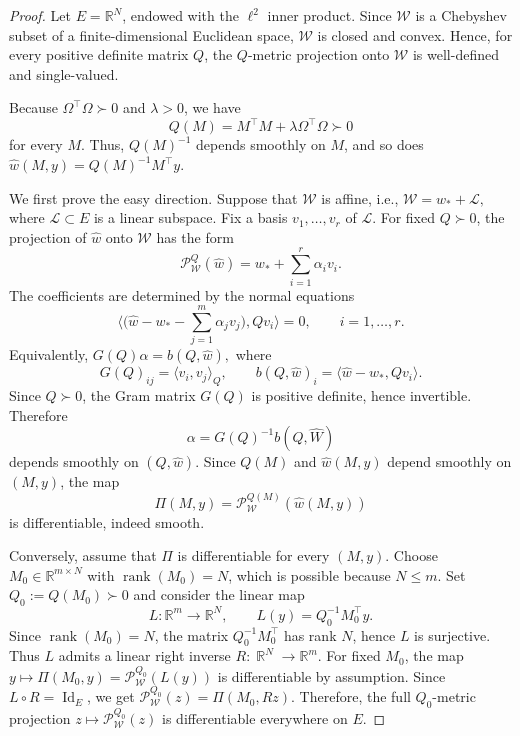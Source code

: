 \documentclass[10pt,a4paper]{amsart}
\DeclareMathOperator{\R}{\mathbb{R}}
\begin{document}
\begin{proof}
Let \(E=\mathbb R^{N}\), endowed with the $\ell^2$ inner product.
Since \(\mathscr W\) is a Chebyshev subset of a finite-dimensional Euclidean
space, \(\mathscr W\) is closed and convex. Hence, for every positive definite
matrix \(Q\), the \(Q\)-metric projection onto \(\mathscr W\) is well-defined
and single-valued.

Because \(\Omega ^\top\Omega\succ0\) and \(\lambda>0\), we have
\[
Q(M)=M^\top M+\lambda\Omega^\top\Omega\succ0
\]
for every \(M\). Thus, \(Q(M)^{-1}\) depends smoothly on \(M\), and so does $
\widehat w(M,y)= Q(M)^{-1}M^\top y.$

We first prove the easy direction. Suppose that \(\mathscr W\) is affine, i.e., $\mathscr W=w_*+\mathscr L,$ where \(\mathscr L\subset E\) is a linear subspace. Fix a basis
\(v_1,\dots,v_r\) of \(\mathscr L\). For fixed \(Q\succ0\), the projection of
\(\widehat w\) onto \(\mathscr W\) has the form
\[
\mathcal P_{\mathscr W}^Q(\widehat w)
=
w_*+\sum_{i=1}^r \alpha_i v_i.
\]
The coefficients are determined by the normal equations
\[
\langle
\Big(\widehat w-w_*-\sum_{j=1}^m \alpha_j v_j\Big)
,Q v_i
\rangle=0,
\qquad i=1,\dots,r.
\]
Equivalently, $G(Q)\alpha=b(Q,\widehat w),$ where
\[
G(Q)_{ij} = \langle v_i,v_j \rangle_{Q},
\qquad
b(Q,\widehat w)_i=\langle\widehat w-w_*, Q v_i \rangle.
\]
Since \(Q\succ0\), the Gram matrix \(G(Q)\) is positive definite, hence
invertible. Therefore
\[
\alpha=G(Q)^{-1}b(Q,\widehat W)
\]
depends smoothly on \((Q,\widehat w)\). Since \(Q(M)\) and
\(\widehat w(M,y)\) depend smoothly on \((M,y)\), the map
\[
\Pi(M,y)=\mathcal P_{\mathscr W}^{Q(M)}(\widehat w(M,y))
\]
is differentiable, indeed smooth.

Conversely, assume that \(\Pi\) is differentiable for every \((M,y)\).
Choose \(M_0\in\mathbb R^{m\times N}\) with \(\operatorname{rank}(M_0)=N\),
which is possible because \(N \leq m\). Set $Q_0:=Q(M_0)\succ0$ and consider the linear map
\[
L:\mathbb R^{m}\to \mathbb R^{N},
\qquad
L(y)= Q_0^{-1} M_0^\top y.
\]
Since \(\operatorname{rank}(M_0)=N\), the matrix \(Q_0^{-1} M_0^\top\) has rank
\(N\), hence \(L\) is surjective. Thus \(L\) admits a linear right inverse
\(R:\R^N\to\mathbb R^{m}\).
For fixed \(M_0\), the map $
y\mapsto \Pi(M_0,y) = \mathcal P_{\mathscr W}^{Q_0}(L(y))$
is differentiable by assumption. Since \(L\circ R=\operatorname{Id}_E\), we get $\mathcal P_{\mathscr W}^{Q_0}(z) =
\Pi(M_0,Rz)$.
Therefore, the full \(Q_0\)-metric projection $
z\mapsto \mathcal P_{\mathscr W}^{Q_0}(z)$ is differentiable everywhere on \(E\).


\end{proof}
\end{document}
